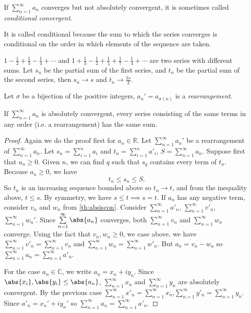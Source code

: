 \begin{notation}
    If \(\sum\limits_{n=1}^{\infty} a_n\) converges but not absolutely convergent, it is sometimes called \textit{conditional convergent}.

    It is called conditional because the sum to which the series converges is conditional on the order in which elements of the sequence are taken.
\end{notation}
\begin{example}
    \(1 - \frac{1}{2} + \frac{1}{3} - \frac{1}{4} + \cdots\) and \(1 + \frac{1}{3}-\frac{1}{2}+\frac{1}{5}+\frac{1}{7}-\frac{1}{4}+\cdots\) are two series with different sums. Let \(s_n\) be the partial sum of the first series, and \(t_n\) be the partial sum of the second series, then \(s_n \to s\) and \(t_n \to \frac{3s}{2}\).
\end{example}
\begin{definition}{}{}
    Let \(\sigma\) be a bijection of the positive integers, \(a_n' = a_{\sigma(n)}\) is a \textit{rearrangement}.
\end{definition}
\begin{theorem}{}{}
    If \(\sum\limits_{n=1}^{\infty} a_n\) is absolutely convergent, every series consisting of the same terms in any order (i.e. a rearrangement) has the same sum.
\end{theorem}
\begin{proof}
    Again we do the proof first for \(a_n \in \mathbb{R}\). Let \(\sum\limits_{n=1}^{\infty} a_n'\) be a rearrangement of \(\sum\limits_{n=1}^{\infty} a_n\). Let \(s_n = \sum\limits_{i=1}^{n} a_i\) and \(t_n = \sum\limits_{i=1}^{n} a'_i\), \(S = \sum\limits_{n=1}^{\infty} a_n\). Suppose first that \(a_n \geq 0\). Given \(n\), we can find \(q\) such that \(s_q\) contains every term of \(t_n\). Because \(a_n \geq 0\), we have
    \[
        t_n \leq s_n \leq S.
    \]
    So \(t_n\) is an increasing sequence bounded above so \(t_n \to t\), and from the inequality above, \(t \leq s\). By symmetry, we have \(s \leq t \implies s = t\).
    If \(a_n\) has any negative term, consider \(v_n\) and \(w_n\) from \cref{th:absiscon}. Consider \(\sum\limits_{n=1}^{\infty} a'_n\), \(\sum\limits_{n=1}^{\infty} v'_n\), \(\sum\limits_{n=1}^{\infty} w_n'\). Since \(\sum\limits_{n=1}^{\infty} \abs{a_n}\) converges, both \(\sum\limits_{n=1}^{\infty} v_n\) and \(\sum\limits_{n=1}^{\infty} w_n\) converge. Using the fact that \(v_n, w_n \geq 0\), we case above, we have \(\sum\limits_{n=1}^{\infty} v'_n = \sum\limits_{n=1}^{\infty} v_n\) and \(\sum\limits_{n=1}^{\infty} w_n = \sum\limits_{n=1}^{\infty} w'_n\). But \(a_n = v_n - w_n\) so \(\sum\limits_{n=1}^{\infty} a_n = \sum\limits_{n=1}^{\infty} a'_n\).

    For the case \(a_n \in \mathbb{C}\), we write \(a_n = x_n + iy_n\). Since \(\abs{x_i}, \abs{y_i} \leq \abs{a_n} \), \(\sum\limits_{n=1}^{\infty} x_n\) and \(\sum\limits_{n=1}^{\infty} y_n\) are absolutely convergent. By the previous case \(\sum\limits_{n=1}^{\infty} x'_n = \sum\limits_{n=1}^{\infty} x_n\),\(\sum\limits_{n=1}^{\infty} y'_n = \sum\limits_{n=1}^{\infty} y_n\). Since \(a'_n = x_n' + iy_n'\) so \(\sum\limits_{n=1}^{\infty} a_n = \sum\limits_{n=1}^{\infty} a'_n\).
\end{proof}
